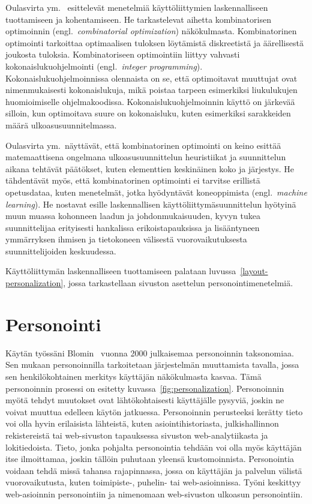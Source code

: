 \documentclass[finnish, 12pt, a4paper, elec, utf8, a-1b, online]{aaltothesis}
\begin{document}
Oulasvirta ym.~\cite{9000519} esittelevät menetelmiä käyttöliittymien
laskennalliseen tuottamiseen ja kohentamiseen. He tarkastelevat aihetta
kombinatorisen optimoinnin (engl.~\textit{combinatorial optimization})
näkökulmasta. Kombinatorinen optimointi tarkoittaa optimaalisen tuloksen
löytämistä diskreetistä ja äärellisestä joukosta tuloksia. Kombinatoriseen
optimointiin liittyy vahvasti kokonaislukuohjelmointi (engl.~\textit{integer
programming}). Kokonaislukuohjelmoinnissa olennaista on se, että optimoitavat
muuttujat ovat nimenmukaisesti kokonaislukuja, mikä poistaa tarpeen esimerkiksi
liukulukujen huomioimiselle ohjelmakoodissa. Kokonaislukuohjelmoinnin käyttö on
järkevää silloin, kun optimoitava suure on kokonaisluku, kuten esimerkiksi
sarakkeiden määrä ulkoasusuunnitelmassa.

Oulasvirta ym.~näyttävät, että kombinatorinen optimointi on keino esittää
matemaattisena ongelmana ulkoasusuunnittelun heuristiikat ja suunnittelun aikana
tehtävät päätökset, kuten elementtien keskinäinen koko ja järjestys. He
tähdentävät myös, että kombinatorinen optimointi ei tarvitse erillistä
opetusdataa, kuten menetelmät, jotka hyödyntävät koneoppimista
(engl.~\textit{machine learning}). He nostavat esille laskennallisen
käyttöliittymäsuunnittelun hyötyinä muun muassa kohonneen laadun ja
johdonmukaisuuden, kyvyn tukea suunnittelijaa erityisesti hankalissa
erikoistapauksissa ja lisääntyneen ymmärryksen ihmisen ja tietokoneen välisestä
vuorovaikutuksesta suunnittelijoiden keskuudessa.

Käyttöliittymän laskennalliseen tuottamiseen palataan
luvussa~\ref{layout-personalization}, jossa tarkastellaan sivuston asettelun
personointimenetelmiä.

\clearpage
\section{Personointi}\label{personalization}

Käytän työssäni Blomin~\cite{10.1145/633292.633483} vuonna 2000 julkaisemaa
personoinnin taksonomiaa. Sen mukaan personoinnilla tarkoitetaan järjestelmän
muuttamista tavalla, jossa sen henkilökohtainen merkitys käyttäjän näkökulmasta
kasvaa. Tämä personoinnin prosessi on esitetty kuvassa~\ref{fig:personalization}.
Personoinnin myötä tehdyt muutokset ovat lähtökohtaisesti käyttäjälle pysyviä,
joskin ne voivat muuttua edelleen käytön jatkuessa. Personoinnin perusteeksi
kerätty tieto voi olla hyvin erilaisista lähteistä, kuten asiointihistoriasta,
julkishallinnon rekistereistä tai web-sivuston tapauksessa sivuston
web-analytiikasta ja lokitiedoista. Tieto, jonka pohjalta personointia tehdään
voi olla myös käyttäjän itse ilmoittamaa, joskin tällöin puhutaan yleensä
kustomoinnista. Personointia voidaan tehdä missä tahansa rajapinnassa, jossa on
käyttäjän ja palvelun välistä vuorovaikutusta, kuten toimipiste-, puhelin- tai
web-asioinnissa. Työni keskittyy web-asioinnin personointiin ja nimenomaan
web-sivuston ulkoasun personointiin.
\end{document}
